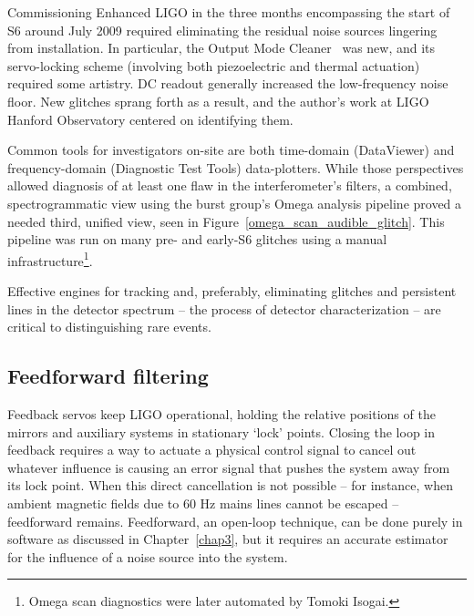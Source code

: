 Commissioning Enhanced LIGO in the three months encompassing the start of S6 around July 2009 required eliminating the residual noise sources lingering from installation. 
In particular, the Output Mode Cleaner~\cite{SmithThesis} was new, and its servo-locking scheme (involving both piezoelectric and thermal actuation) required some artistry.
DC readout generally increased the low-frequency noise floor.
New glitches sprang forth as a result, and the author's work at LIGO Hanford Observatory centered on identifying them.

Common tools for investigators on-site are both time-domain (DataViewer) and frequency-domain (Diagnostic Test Tools) data-plotters.
While those perspectives allowed diagnosis of at least one flaw in the interferometer's filters, a combined, spectrogrammatic view using the burst group's Omega analysis pipeline proved a needed third, unified view, seen in Figure~\ref{omega_scan_audible_glitch}.
This pipeline was run on many pre- and early-S6 glitches using a manual infrastructure\footnote{Omega scan diagnostics were later automated by Tomoki Isogai.}.

Effective engines for tracking and, preferably, eliminating glitches and persistent lines in the detector spectrum -- the process of detector characterization -- are critical to distinguishing rare events.


                \subsection{Feedforward filtering}
                \label{feedforward_filters}

Feedback servos keep LIGO operational, holding the relative positions of the mirrors and auxiliary systems in stationary `lock' points.
Closing the loop in feedback requires a way to actuate a physical control signal to cancel out whatever influence is causing an error signal that pushes the system away from its lock point.
When this direct cancellation is not possible -- for instance, when ambient magnetic fields due to 60 Hz mains lines cannot be escaped -- feedforward remains.
Feedforward, an open-loop technique, can be done purely in software as discussed in Chapter~\ref{chap3}, but it requires an accurate estimator for the influence of a noise source into the system.

